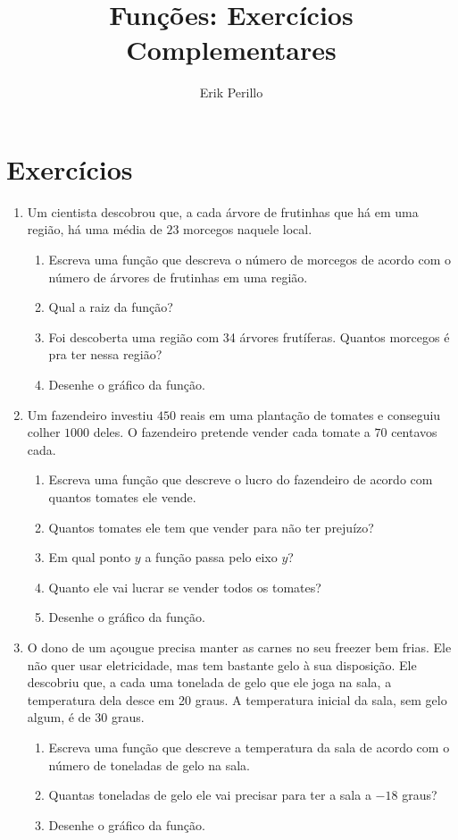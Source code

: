 \documentclass[11pt]{article}
\begin{document}
\title{Funções: Exercícios Complementares}
\author{Erik Perillo}
\date{}
\maketitle

\newpage

\section{Exercícios}
\begin{enumerate}
	\item Um cientista descobrou que, a cada árvore de frutinhas que há em uma
		região, há uma média de $23$ morcegos naquele local.
	\begin{enumerate}
		\item Escreva uma função que descreva o número de morcegos de acordo
			com o número de árvores de frutinhas em uma região.
		\item Qual a raiz da função?
		\item Foi descoberta uma região com 34 árvores frutíferas. Quantos 
			morcegos é pra ter nessa região?
		\item Desenhe o gráfico da função.
	\end{enumerate}

	\item Um fazendeiro investiu $450$ reais em uma plantação de tomates e 
		conseguiu colher $1000$ deles. O fazendeiro pretende vender cada tomate
		a $70$ centavos cada.
	\begin{enumerate}
		\item Escreva uma função que descreve o lucro do fazendeiro de acordo
			com quantos tomates ele vende.
		\item Quantos tomates ele tem que vender para não ter prejuízo?
		\item Em qual ponto $y$ a função passa pelo eixo $y$?
		\item Quanto ele vai lucrar se vender todos os tomates?
		\item Desenhe o gráfico da função.
	\end{enumerate}

	\item O dono de um açougue precisa manter as carnes no seu freezer bem 
		frias. Ele não quer usar eletricidade, mas tem bastante gelo à sua 
		disposição. Ele descobriu que, a cada uma tonelada de gelo que ele joga
		na sala, a temperatura dela desce em 20 graus. A temperatura inicial
		da sala, sem gelo algum, é de 30 graus.
	\begin{enumerate}
		\item Escreva uma função que descreve a temperatura da sala de acordo
			com o número de toneladas de gelo na sala.
		\item Quantas toneladas de gelo ele vai precisar para ter a sala a 
			$-18$ graus?
		\item Desenhe o gráfico da função.
	\end{enumerate}


\end{enumerate}
\end{document}
